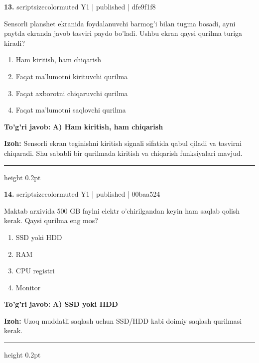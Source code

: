 \documentclass[10pt,a4paper]{article}
\begin{document}
{\bfseries\sffamily\color{ink} 13.} {scriptsizecolor{muted} Y1 | published | dfe9f1f8}
\par
Sensorli planshet ekranida foydalanuvchi barmog'i bilan tugma bosadi, ayni paytda ekranda javob tasviri paydo bo'ladi. Ushbu ekran qaysi qurilma turiga kiradi?
\begin{enumerate}[label=\Alph*),leftmargin=9mm]
\item Ham kiritish, ham chiqarish
\item Faqat ma'lumotni kirituvchi qurilma
\item Faqat axborotni chiqaruvchi qurilma
\item Faqat ma'lumotni saqlovchi qurilma
\end{enumerate}
\begin{tcolorbox}[enhanced,breakable,colback=teal!4,colframe=teal!60!black,boxrule=0.45pt,arc=1.2mm,left=2.7mm,right=2.7mm,top=1.8mm,bottom=1.8mm,before skip=2mm,after skip=2mm]
{\bfseries\sffamily\color{teal}To'g'ri javob:} \textbf{A) Ham kiritish, ham chiqarish}
\par\smallskip
{\bfseries Izoh:} Sensorli ekran teginishni kiritish signali sifatida qabul qiladi va tasvirni chiqaradi. Shu sababli bir qurilmada kiritish va chiqarish funksiyalari mavjud.
\end{tcolorbox}
\vspace{2mm}\hrule height 0.2pt\vspace{3mm}

{\bfseries\sffamily\color{ink} 14.} {scriptsizecolor{muted} Y1 | published | 00baa524}
\par
Maktab arxivida 500 GB faylni elektr o'chirilgandan keyin ham saqlab qolish kerak. Qaysi qurilma eng mos?
\begin{enumerate}[label=\Alph*),leftmargin=9mm]
\item SSD yoki HDD
\item RAM
\item CPU registri
\item Monitor
\end{enumerate}
\begin{tcolorbox}[enhanced,breakable,colback=teal!4,colframe=teal!60!black,boxrule=0.45pt,arc=1.2mm,left=2.7mm,right=2.7mm,top=1.8mm,bottom=1.8mm,before skip=2mm,after skip=2mm]
{\bfseries\sffamily\color{teal}To'g'ri javob:} \textbf{A) SSD yoki HDD}
\par\smallskip
{\bfseries Izoh:} Uzoq muddatli saqlash uchun SSD/HDD kabi doimiy saqlash qurilmasi kerak.
\end{tcolorbox}
\vspace{2mm}\hrule height 0.2pt\vspace{3mm}
\end{document}
